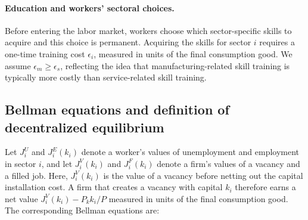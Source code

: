 \documentclass[12pt]{article} %
\theoremstyle{definition}
\begin{document}
\paragraph{Education and workers' sectoral choices.}
Before entering the labor market, workers choose which sector-specific skills to acquire and this choice is permanent.  
Acquiring the skills for sector $i$ requires a one-time training cost $\epsilon_i$, measured in units of the final consumption good.  We assume $\epsilon_m \geq \epsilon_s$, reflecting the idea that manufacturing-related skill training is  typically more costly than service-related skill training.  %






\subsection{Bellman equations and definition of decentralized equilibrium}\label{sec:DE}






Let $J_i^U$ and $J_i^E(k_i)$ denote a worker’s values of unemployment and employment in sector $i$, and let $J_i^V(k_i)$ and $J_i^F(k_i)$ denote a firm’s values of a vacancy and a filled job. Here, $J^V_i(k_i)$  is  the value of a vacancy before netting out the capital installation cost. A firm that creates a vacancy with capital $k_i$ therefore earns a net value  $J^V_i(k_i) - P_kk_i/P$ measured in units of the final consumption good. 
The corresponding Bellman equations are:
\end{document}
